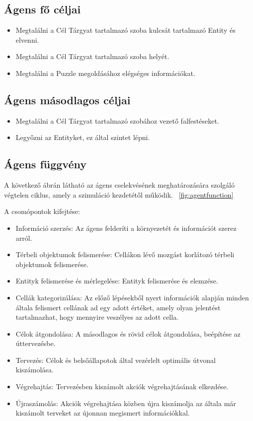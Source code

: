 \subsection{Ágens fő céljai}

\begin{itemize}
    \item Megtalálni a Cél Tárgyat tartalmazó szoba kulcsát tartalmazó Entity és elvenni.
    \item Megtalálni a Cél Tárgyat tartalmazó szoba helyét.
    \item Megtalálni a Puzzle megoldásához elégséges információkat.
\end{itemize}

\subsection{Ágens másodlagos céljai}

\begin{itemize}
    \item Megtalálni a Cél Tárgyat tartalmazó szobához vezető falfestéseket.
    \item Legyőzni az Entityket, ez által szintet lépni.
\end{itemize}

\subsection{Ágens függvény}

A következő ábrán látható az ágens cselekvésének meghatározására szolgáló végtelen ciklus, amely a szimuláció kezdetétől működik. ~\ref{fig:agentfunction}

\noindent A csomópontok kifejtése:

\begin{itemize}
    \item Információ szerzés:
    Az ágens felderíti a környezetét és információt szerez arról.
    \item Térbeli objektumok felismerése:
    Cellákon lévő mozgást korlátozó térbeli objektumok felismerése.
    \item Entityk felismerése és mérlegelése:
    Entityk felismerése és elemzése.
    \item Cellák kategorizálása:
    Az előző lépésekből nyert információk alapján minden általa felismert cellának ad egy adott értéket, amely olyan jelentést tartalmazhat, hogy mennyire veszélyes az adott cella.
    \item Célok átgondolása:
    A másodlagos és rövid célok átgondolása, beépítése az úttervezésbe.
    \item Tervezés:
    Célok és belsőállapotok által vezérlelt optimális útvonal kiszámolása.
    \item Végrehajtás: 
    Tervezésben kiszámolt akciók végrehajtásának elkezdése.
    \item Újraszámolás:
    Akciók végrehajtása közben újra kiszámolja az általa már kiszámolt terveket az újonnan megismert információkkal.
\end{itemize}


